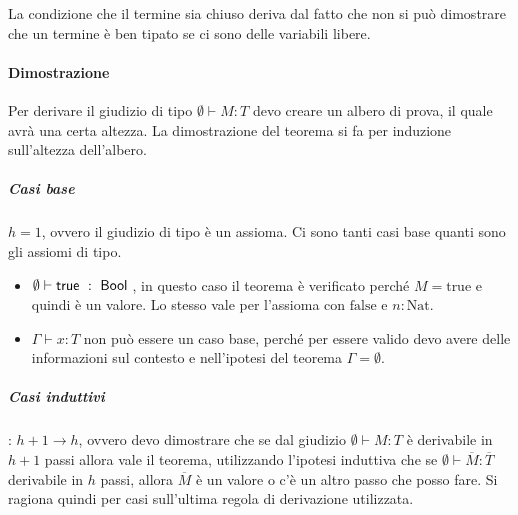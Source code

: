 \noindent La condizione che il termine sia chiuso deriva dal fatto che non si può dimostrare che un termine è ben tipato se ci sono delle variabili libere.

\paragraph{Dimostrazione}

Per derivare il giudizio di tipo $\emptyset \vdash M : T$ devo creare un albero di prova, il quale avrà una certa altezza. La dimostrazione del teorema si fa per induzione sull'altezza dell'albero.

\subparagraph{Casi base} $h = 1$, ovvero il giudizio di tipo è un assioma. Ci sono tanti casi base quanti sono gli assiomi di tipo.

\begin{itemize}
	\item $\emptyset \vdash \text{true } : \Bool$, in questo caso il teorema è verificato perché $M = \text{true}$ e quindi è un valore. Lo stesso vale per l'assioma con $\text{false}$ e $n :\text{Nat}$.
	\item $\Gamma \vdash x : T$ non può essere un caso base, perché per essere valido devo avere delle informazioni sul contesto e nell'ipotesi del teorema $\Gamma = \emptyset$.
\end{itemize} 

\subparagraph{Casi induttivi}: $h+1 \rightarrow h$, ovvero devo dimostrare che se dal giudizio $\emptyset \vdash M : T$ è derivabile in $h+1$ passi allora vale il teorema, utilizzando l'ipotesi induttiva che se $\emptyset \vdash \overline{M} : \overline{T}$ derivabile in $h$ passi, allora $\overline{M}$ è un valore o c'è un altro passo che posso fare.
Si ragiona quindi per casi sull'ultima regola di derivazione utilizzata.


